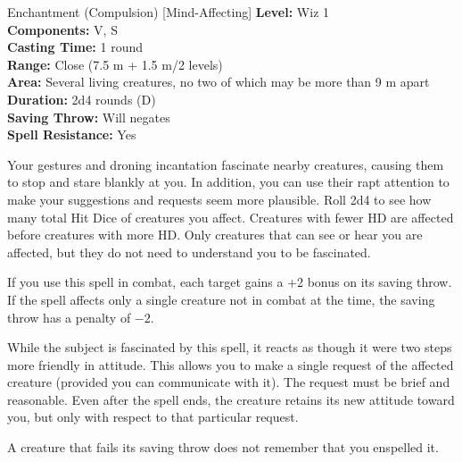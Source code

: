 {Enchantment (Compulsion) [Mind-Affecting]}
{
	\textbf{Level:}
	Wiz 1\\
	\textbf{Components:}
	V, S\\
	\textbf{Casting Time:}
	1 round\\
	\textbf{Range:}
	Close (7.5 m + 1.5 m/2 levels)\\
	\textbf{Area:}
	Several living creatures, no two of which may be more than 9 m apart\\
	\textbf{Duration:}
	2d4 rounds (D)\\
	\textbf{Saving Throw:}
	Will negates\\
	\textbf{Spell Resistance:}
	Yes\\
}
{
	Your gestures and droning incantation fascinate nearby creatures, causing them to stop and stare blankly at you. In addition, you can use their rapt attention to make your suggestions and requests seem more plausible. Roll 2d4 to see how many total Hit Dice of creatures you affect. Creatures with fewer HD are affected before creatures with more HD. Only creatures that can see or hear you are affected, but they do not need to understand you to be fascinated.

	If you use this spell in combat, each target gains a +2 bonus on its saving throw. If the spell affects only a single creature not in combat at the time, the saving throw has a penalty of $-2$.

	While the subject is fascinated by this spell, it reacts as though it were two steps more friendly in attitude. This allows you to make a single request of the affected creature (provided you can communicate with it). The request must be brief and reasonable. Even after the spell ends, the creature retains its new attitude toward you, but only with respect to that particular request.

	A creature that fails its saving throw does not remember that you enspelled it.

}
